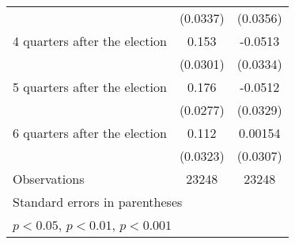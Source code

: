 \begin{table}[htbp]
\begin{tabular}{l*{2}{c}}
                    &    (0.0337)         &    (0.0356)         \\
[1em]
 4 quarters after the election&       0.153\sym{***}&     -0.0513         \\
                    &    (0.0301)         &    (0.0334)         \\
[1em]
 5 quarters after the election&       0.176\sym{***}&     -0.0512         \\
                    &    (0.0277)         &    (0.0329)         \\
[1em]
 6 quarters after the election&       0.112\sym{***}&     0.00154         \\
                    &    (0.0323)         &    (0.0307)         \\
\hline
Observations        &       23248         &       23248         \\
\hline\hline
\multicolumn{3}{l}{\footnotesize Standard errors in parentheses}\\
\multicolumn{3}{l}{\footnotesize \sym{*} \(p<0.05\), \sym{**} \(p<0.01\), \sym{***} \(p<0.001\)}\\
\end{tabular}
\end{table}
